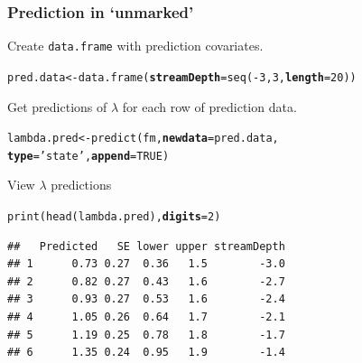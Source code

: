\documentclass[color=usenames,dvipsnames]{beamer}\usepackage[]{graphicx}\usepackage[]{color}
\makeatletter
\newcommand{\hlnum}[1]{\textcolor[rgb]{0.69,0.494,0}{#1}}%
\newcommand{\hlstr}[1]{\textcolor[rgb]{0.749,0.012,0.012}{#1}}%
\newcommand{\hlopt}[1]{\textcolor[rgb]{0,0,0}{#1}}%
\newcommand{\hlstd}[1]{\textcolor[rgb]{0,0,0}{#1}}%
\newcommand{\hlkwb}[1]{\textcolor[rgb]{0,0.341,0.682}{#1}}%
\newcommand{\hlkwc}[1]{\textcolor[rgb]{0,0,0}{\textbf{#1}}}%
\newcommand{\hlkwd}[1]{\textcolor[rgb]{0.004,0.004,0.506}{#1}}%
\newenvironment{kframe}{%
 \def\at@end@of@kframe{}%
 \ifinner\ifhmode%
  \def\at@end@of@kframe{\end{minipage}}%
  \begin{minipage}{\columnwidth}%
 \fi\fi%
 \def\FrameCommand##1{\hskip\@totalleftmargin \hskip-\fboxsep
 \colorbox{shadecolor}{##1}\hskip-\fboxsep
     \hskip-\linewidth \hskip-\@totalleftmargin \hskip\columnwidth}%
 \MakeFramed {\advance\hsize-\width
   \@totalleftmargin\z@ \linewidth\hsize
   \@setminipage}}%
 {\par\unskip\endMakeFramed%
 \at@end@of@kframe}
\newenvironment{knitrout}{}{} %
\makeatother
\begin{document}
\begin{frame}[fragile]
  \frametitle{Prediction in `unmarked'}
  \small
  Create \texttt{data.frame} with prediction covariates. 
  \vspace{-6pt}
\begin{knitrout}\footnotesize
{}\color{fgcolor}\begin{kframe}
\begin{alltt}
\hlstd{pred.data} \hlkwb{<-} \hlkwd{data.frame}\hlstd{(}\hlkwc{streamDepth}\hlstd{=}\hlkwd{seq}\hlstd{(}\hlopt{-}\hlnum{3}\hlstd{,} \hlnum{3}\hlstd{,} \hlkwc{length}\hlstd{=}\hlnum{20}\hlstd{))}
\end{alltt}
\end{kframe}
\end{knitrout}
\pause
\vfill
Get predictions of $\lambda$ for each row of prediction data.
  \vspace{-6pt}
\begin{knitrout}\footnotesize
{}\color{fgcolor}\begin{kframe}
\begin{alltt}
\hlstd{lambda.pred} \hlkwb{<-} \hlkwd{predict}\hlstd{(fm,} \hlkwc{newdata}\hlstd{=pred.data,}
                       \hlkwc{type}\hlstd{=}\hlstr{'state'}\hlstd{,} \hlkwc{append}\hlstd{=}\hlnum{TRUE}\hlstd{)}
\end{alltt}
\end{kframe}
\end{knitrout}
\pause
\vfill
  View $\lambda$ predictions
  \vspace{-6pt}
\begin{knitrout}\footnotesize
{}\color{fgcolor}\begin{kframe}
\begin{alltt}
\hlkwd{print}\hlstd{(}\hlkwd{head}\hlstd{(lambda.pred),} \hlkwc{digits}\hlstd{=}\hlnum{2}\hlstd{)}
\end{alltt}
\begin{verbatim}
##   Predicted   SE lower upper streamDepth
## 1      0.73 0.27  0.36   1.5        -3.0
## 2      0.82 0.27  0.43   1.6        -2.7
## 3      0.93 0.27  0.53   1.6        -2.4
## 4      1.05 0.26  0.64   1.7        -2.1
## 5      1.19 0.25  0.78   1.8        -1.7
## 6      1.35 0.24  0.95   1.9        -1.4
\end{verbatim}
\end{kframe}
\end{knitrout}
\end{frame}
\end{document}
